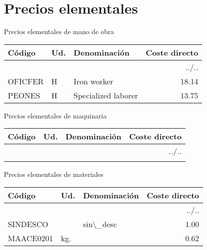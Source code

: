 \documentclass{book}%
\begin{document}
%
\normalsize%
\part{Precios elementales}%
\label{sec:Precioselementales}%
\begin{center}
%
\Large%
 Precios elementales de mano de obra %
\normalsize%
\end{center}
%
\small%
\begin{longtable}{|l|l|p{4cm}|r|}%
\hline%
Código&Ud.&Denominación&Coste directo\\%
\hline%
\endhead%
\hline%
\multicolumn{4}{|r|}{../..}\\%
\hline%
\endfoot%
\hline%
\endlastfoot%
OFICFER&H&Iron worker&18.14\\%
PEONES&H&Specialized laborer&13.75\\%
\end{longtable}%
\normalsize%
\begin{center}
%
\Large%
 Precios elementales de maquinaria %
\normalsize%
\end{center}
%
\small%
\begin{longtable}{|l|l|p{4cm}|r|}%
\hline%
Código&Ud.&Denominación&Coste directo\\%
\hline%
\endhead%
\hline%
\multicolumn{4}{|r|}{../..}\\%
\hline%
\endfoot%
\hline%
\endlastfoot%
\end{longtable}%
\normalsize%
\begin{center}
%
\Large%
 Precios elementales de materiales %
\normalsize%
\end{center}
%
\small%
\begin{longtable}{|l|l|p{4cm}|r|}%
\hline%
Código&Ud.&Denominación&Coste directo\\%
\hline%
\endhead%
\hline%
\multicolumn{4}{|r|}{../..}\\%
\hline%
\endfoot%
\hline%
\endlastfoot%
SINDESCO&&sin\textbackslash{}\_desc&1.00\\%
MAACE0201&kg.&&0.62\\%
\end{longtable}%
\normalsize

%
\end{document}
